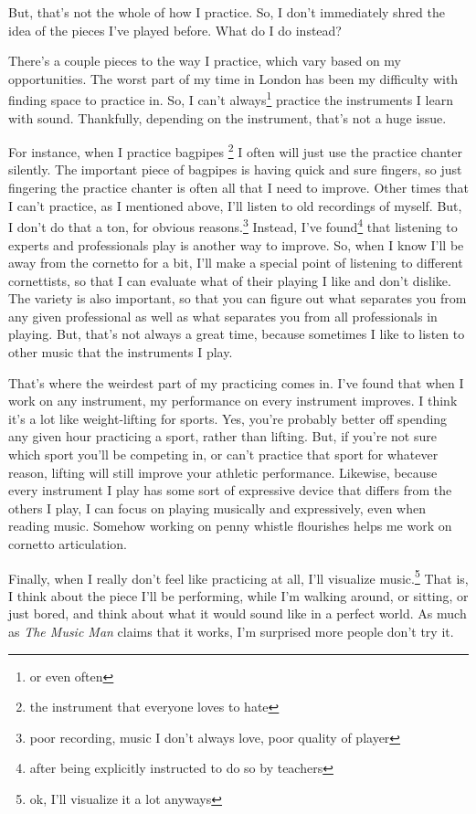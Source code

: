 \documentclass[12pt]{article}[titlepage]
\newcommand{\1}{\={a}}
\newcommand{\2}{\={e}}
\newcommand{\3}{\={\i}}
\newcommand{\4}{\=o}
\newcommand{\5}{\=u}
\newcommand{\6}{\={A}}
\renewcommand{\,}{\textsuperscript{,}}
\begin{document}
But, that's not the whole of how I practice.
So, I don't immediately shred the idea of the pieces I've played before.
What do I do instead?

There's a couple pieces to the way I practice, which vary based on my opportunities.
The worst part of my time in London has been my difficulty with finding space to practice in.
So, I can't always\footnote{or even often} practice the instruments I learn with sound.
Thankfully, depending on the instrument, that's not a huge issue.

For instance, when I practice bagpipes \footnote{the instrument that everyone loves to hate} I often will just use the practice chanter silently.
The important piece of bagpipes is having quick and sure fingers, so just fingering the practice chanter is often all that I need to improve.
Other times that I can't practice, as I mentioned above, I'll listen to old recordings of myself.
But, I don't do that a ton, for obvious reasons.\footnote{poor recording, music I don't always love, poor quality of player}
Instead, I've found\footnote{after being explicitly instructed to do so by teachers} that listening to experts and professionals play is another way to improve.
So, when I know I'll be away from the cornetto for a bit, I'll make a special point of listening to different cornettists, so that I can evaluate what of their playing I like and don't dislike.
The variety is also important, so that you can figure out what separates you from any given professional as well as what separates you from all professionals in playing.
But, that's not always a great time, because sometimes I like to listen to other music that the instruments I play.

That's where the weirdest part of my practicing comes in.
I've found that when I work on any instrument, my performance on every instrument improves.
I think it's a lot like weight-lifting for sports.
Yes, you're probably better off spending any given hour practicing a sport, rather than lifting.
But, if you're not sure which sport you'll be competing in, or can't practice that sport for whatever reason, lifting will still improve your athletic performance.
Likewise, because every instrument I play has some sort of expressive device that differs from the others I play, I can focus on playing musically and expressively, even when reading music.
Somehow working on penny whistle flourishes helps me work on cornetto articulation.

Finally, when I really don't feel like practicing at all, I'll visualize music.\footnote{ok, I'll visualize it a lot anyways}
That is, I think about the piece I'll be performing, while I'm walking around, or sitting, or just bored, and think about what it would sound like in a perfect world.
As much as \textit{The Music Man} claims that it works, I'm surprised more people don't try it.
\end{document}
